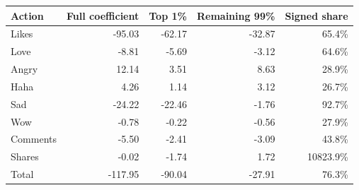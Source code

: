 \begin{tabular}{lrrrr}
\toprule
Action & Full coefficient & Top 1\% & Remaining 99\% & Signed share \\
\midrule
Likes & -95.03 & -62.17 & -32.87 & 65.4\% \\
Love & -8.81 & -5.69 & -3.12 & 64.6\% \\
Angry & 12.14 & 3.51 & 8.63 & 28.9\% \\
Haha & 4.26 & 1.14 & 3.12 & 26.7\% \\
Sad & -24.22 & -22.46 & -1.76 & 92.7\% \\
Wow & -0.78 & -0.22 & -0.56 & 27.9\% \\
Comments & -5.50 & -2.41 & -3.09 & 43.8\% \\
Shares & -0.02 & -1.74 & 1.72 & 10823.9\% \\
Total & -117.95 & -90.04 & -27.91 & 76.3\% \\
\bottomrule
\end{tabular}
